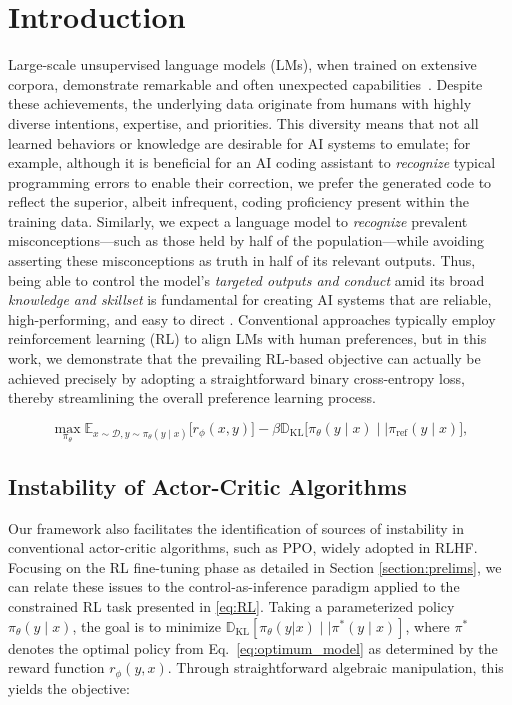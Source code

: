 \section{Introduction}
Large-scale unsupervised language models (LMs), when trained on extensive corpora, demonstrate remarkable and often unexpected capabilities~\citep{chowdhery2022palm, brown2020language, touvron2023llama,bubeck2023sparks}. Despite these achievements, the underlying data originate from humans with highly diverse intentions, expertise, and priorities. This diversity means that not all learned behaviors or knowledge are desirable for AI systems to emulate; for example, although it is beneficial for an AI coding assistant to \textit{recognize} typical programming errors to enable their correction, we prefer the generated code to reflect the superior, albeit infrequent, coding proficiency present within the training data. Similarly, we expect a language model to \textit{recognize} prevalent misconceptions—such as those held by half of the population—while avoiding asserting these misconceptions as truth in half of its relevant outputs. Thus, being able to control the model’s \emph{targeted outputs and conduct} amid its broad \textit{knowledge and skillset} is fundamental for creating AI systems that are reliable, high-performing, and easy to direct \citep{ouyang2022training}. Conventional approaches typically employ reinforcement learning (RL) to align LMs with human preferences, but in this work, we demonstrate that the prevailing RL-based objective can actually be achieved precisely by adopting a straightforward binary cross-entropy loss, thereby streamlining the overall preference learning process.

\begin{equation}\label{eq:RL}
\max_{\pi_{\theta}}  \mathbb{E}_{x\sim \mathcal{D}, y\sim \pi_{\theta}(y \mid x)}\bigl[r_{\phi}(x, y)\bigr] - \beta\mathbb{D}_{\textrm{KL}}\bigl[\pi_{\theta}(y\mid x)\mid \mid \pi_\text{ref}(y\mid x)\bigr],
\end{equation}

\subsection{Instability of Actor-Critic Algorithms} Our framework also facilitates the identification of sources of instability in conventional actor-critic algorithms, such as PPO, widely adopted in RLHF. Focusing on the RL fine-tuning phase as detailed in Section \ref{section:prelims}, we can relate these issues to the control-as-inference paradigm \cite{levine2018reinforcement} applied to the constrained RL task presented in \ref{eq:RL}. Taking a parameterized policy $\pi_{\theta}(y\mid x)$, the goal is to minimize $\mathbb{D}_{\text{KL}}[\pi_{\theta}(y|x) \mid \mid \pi^*(y\mid x)]$, where $\pi^*$ denotes the optimal policy from Eq.~\ref{eq:optimum_model} as determined by the reward function $r_{\phi}(y, x)$. Through straightforward algebraic manipulation, this yields the objective:

